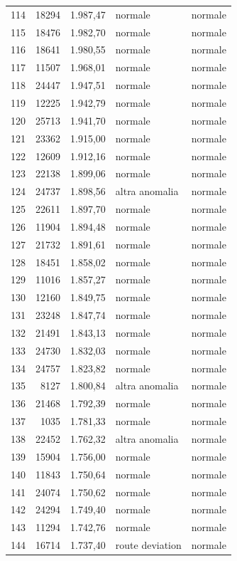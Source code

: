 {\begin{longtable}{rrrll}
114 & 18294 & 1.987,47 & normale & normale \\
115 & 18476 & 1.982,70 & normale & normale \\
116 & 18641 & 1.980,55 & normale & normale \\
117 & 11507 & 1.968,01 & normale & normale \\
118 & 24447 & 1.947,51 & normale & normale \\
119 & 12225 & 1.942,79 & normale & normale \\
120 & 25713 & 1.941,70 & normale & normale \\
121 & 23362 & 1.915,00 & normale & normale \\
122 & 12609 & 1.912,16 & normale & normale \\
123 & 22138 & 1.899,06 & normale & normale \\
124 & 24737 & 1.898,56 & altra anomalia & normale \\
125 & 22611 & 1.897,70 & normale & normale \\
126 & 11904 & 1.894,48 & normale & normale \\
127 & 21732 & 1.891,61 & normale & normale \\
128 & 18451 & 1.858,02 & normale & normale \\
129 & 11016 & 1.857,27 & normale & normale \\
130 & 12160 & 1.849,75 & normale & normale \\
131 & 23248 & 1.847,74 & normale & normale \\
132 & 21491 & 1.843,13 & normale & normale \\
133 & 24730 & 1.832,03 & normale & normale \\
134 & 24757 & 1.823,82 & normale & normale \\
135 & 8127 & 1.800,84 & altra anomalia & normale \\
136 & 21468 & 1.792,39 & normale & normale \\
137 & 1035 & 1.781,33 & normale & normale \\
138 & 22452 & 1.762,32 & altra anomalia & normale \\
139 & 15904 & 1.756,00 & normale & normale \\
140 & 11843 & 1.750,64 & normale & normale \\
141 & 24074 & 1.750,62 & normale & normale \\
142 & 24294 & 1.749,40 & normale & normale \\
143 & 11294 & 1.742,76 & normale & normale \\
144 & 16714 & 1.737,40 & route deviation & normale \\

\end{longtable}}
